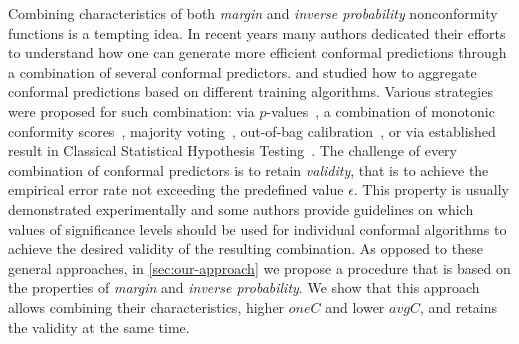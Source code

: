 Combining characteristics of both \textit{margin} and \textit{inverse
probability} nonconformity functions is a tempting idea. 
In recent years many authors dedicated
their efforts to understand how one can generate more efficient conformal
predictions through a combination of several conformal predictors.
\cite{yang2021finite} and \cite{toccaceli2019combination} studied how to aggregate
conformal 
predictions based on different training algorithms. Various strategies were 
proposed for such combination: via $p$-values~\citep{toccaceli2017combination},
a combination of monotonic conformity scores~\citep{gauraha2018synergy},
majority voting~\citep{cherubin2019majority},  
out-of-bag calibration~\citep{linusson2020efficient}, or via 
established result in Classical Statistical Hypothesis
Testing~\citep{toccaceli2019conformal}.
The challenge of every combination of conformal predictors is to retain \textit{validity}, that is 
to achieve the empirical error rate not exceeding the predefined value $\epsilon$.
This property is usually demonstrated experimentally and some authors provide 
guidelines on which values of significance levels should be used for individual
conformal algorithms to achieve the desired validity of the resulting combination.
As opposed to these general approaches, in \cref{sec:our-approach} we
propose a procedure that is based on the 
properties of \textit{margin} and \textit{inverse probability}. We show that this approach
allows combining their characteristics, higher $oneC$ and
lower $avgC$, and retains the validity at the same time.


